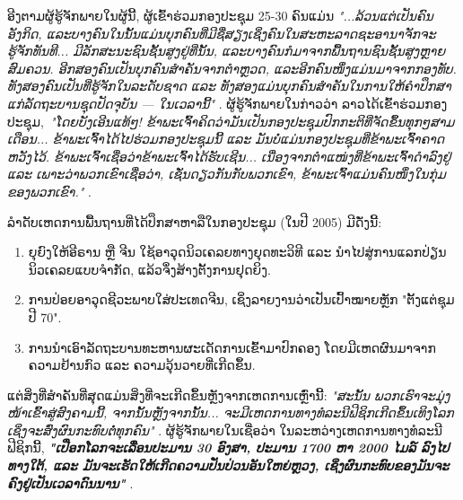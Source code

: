 \documentclass[10pt,twocolumn,letterpaper]{article}
\begin{document}
ອີງຕາມຜູ້ຮູ້ຈັກພາຍໃນຜູ້ນີ້, ຜູ້ເຂົ້າຮ່ວມກອງປະຊຸມ 25-30 ຄົນແມ່ນ \textit{"...ລ້ວນແຕ່ເປັນຄົນອັງກິດ, ແລະບາງຄົນໃນນັ້ນແມ່ນບຸກຄົນທີ່ມີຊື່ສຽງເຊິ່ງຄົນໃນສະຫະລາດຊະອານາຈັກຈະຮູ້ຈັກທັນທີ... ມີລັກສະນະຊົນຊັ້ນສູງຢູ່ທີ່ນັ້ນ, ແລະບາງຄົນກໍມາຈາກພື້ນຖານຊົນຊັ້ນສູງຫຼາຍສົມຄວນ.  ອີກສອງຄົນເປັນບຸກຄົນສຳຄັນຈາກຕຳຫຼວດ, ແລະອີກຄົນໜຶ່ງແມ່ນມາຈາກກອງທັບ. ທັງສອງຄົນເປັນທີ່ຮູ້ຈັກໃນລະດັບຊາດ ແລະ ທັງສອງແມ່ນບຸກຄົນສຳຄັນໃນການໃຫ້ຄຳປຶກສາແກ່ລັດຖະບານຊຸດປັດຈຸບັນ — ໃນເວລານີ້"} \cite{4}. ຜູ້ຮູ້ຈັກພາຍໃນກ່າວວ່າ ລາວໄດ້ເຂົ້າຮ່ວມກອງປະຊຸມ,\ \textit{"ໂດຍບັງເອີນແທ້ໆ! ຂ້າພະເຈົ້າຄິດວ່າມັນເປັນກອງປະຊຸມປົກກະຕິທີ່ຈັດຂຶ້ນທຸກໆສາມເດືອນ... ຂ້າພະເຈົ້າໄດ້ໄປຮ່ວມກອງປະຊຸມນີ້ ແລະ ມັນບໍ່ແມ່ນກອງປະຊຸມທີ່ຂ້າພະເຈົ້າຄາດຫວັງໄວ້. ຂ້າພະເຈົ້າເຊື່ອວ່າຂ້າພະເຈົ້າໄດ້ຮັບເຊີນ... ເນື່ອງຈາກຕໍາແໜ່ງທີ່ຂ້າພະເຈົ້າດໍາລົງຢູ່ ແລະ ເພາະວ່າພວກເຂົາເຊື່ອວ່າ, ເຊັ່ນດຽວກັນກັບພວກເຂົາ, ຂ້າພະເຈົ້າແມ່ນຄົນໜຶ່ງໃນກຸ່ມຂອງພວກເຂົາ."} \cite{4}.

ລໍາດັບເຫດການພື້ນຖານທີ່ໄດ້ປຶກສາຫາລືໃນກອງປະຊຸມ (ໃນປີ 2005) ມີດັ່ງນີ້:

\begin{flushleft}
\begin{enumerate}
    \item ຍຸຍົງໃຫ້ອີຣານ ຫຼື ຈີນ ໃຊ້ອາວຸດນິວເຄລຍທາງຍຸດທະວິທີ ແລະ ນໍາໄປສູ່ການແລກປ່ຽນນິວເຄລຍແບບຈໍາກັດ, ແລ້ວຈຶ່ງສ້າງຕັ້ງການຢຸດຍິງ.
    \item ການປ່ອຍອາວຸດຊີວະພາບໃສ່ປະເທດຈີນ, ເຊິ່ງລາຍງານວ່າເປັນເປົ້າໝາຍຫຼັກ "ຕັ້ງແຕ່ຊຸມປີ 70".
    \item ການນຳເອົາລັດຖະບານທະຫານຜະເດັດການເຂົ້າມາປົກຄອງ ໂດຍມີເຫດຜົນມາຈາກຄວາມຢ້ານກົວ ແລະ ຄວາມວຸ້ນວາຍທີ່ເກີດຂຶ້ນ.
\end{enumerate}
\end{flushleft}

ແຕ່ສິ່ງທີ່ສຳຄັນທີ່ສຸດແມ່ນສິ່ງທີ່ຈະເກີດຂຶ້ນຫຼັງຈາກເຫດການເຫຼົ່ານີ້: \textit{"ສະນັ້ນ ພວກເຮົາຈະມຸ່ງໜ້າເຂົ້າສູ່ສົງຄາມນີ້, ຈາກນັ້ນຫຼັງຈາກນັ້ນ... ຈະມີເຫດການທາງທໍລະນີຟີຊິກເກີດຂຶ້ນເທິງໂລກ ເຊິ່ງຈະສົ່ງຜົນກະທົບຕໍ່ທຸກຄົນ"} \cite{4}. ຜູ້ຮູ້ຈັກພາຍໃນເຊື່ອວ່າ ໃນລະຫວ່າງເຫດການທາງທໍລະນີຟີຊິກນີ້, \textit{\textbf{"ເປືອກໂລກຈະເລື່ອນປະມານ 30 ອົງສາ, ປະມານ 1700 ຫາ 2000 ໄມລ໌ ລົງໄປທາງໃຕ້, ແລະ ມັນຈະເຮັດໃຫ້ເກີດຄວາມປັ່ນປ່ວນອັນໃຫຍ່ຫຼວງ, ເຊິ່ງຜົນກະທົບຂອງມັນຈະຄົງຢູ່ເປັນເວລາດົນນານ"}} \cite{4}.
\end{document}
